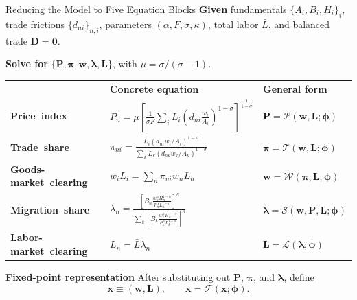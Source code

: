 \documentclass[aspectratio=169,11pt]{beamer}
\newcommand{\B}[1]{\textcolor{blue1}{\textbf{#1}}}
\begin{document}
\begin{frame}[t]{Reducing the Model to Five Equation Blocks}
  \scriptsize
  \B{Given}\quad
  fundamentals \(\{A_i,B_i,H_i\}_i\), trade frictions
  \(\{d_{ni}\}_{n,i}\), parameters \((\alpha,F,\sigma,\kappa)\),
  total labor \(\bar L\), and balanced trade \(\mathbf D=\mathbf0\).

  \smallskip
  \B{Solve for}\quad
  \(\{\mathbf P,\boldsymbol\pi,\mathbf w,
  \boldsymbol\lambda,\mathbf L\}\), with
  \(\mu=\sigma/(\sigma-1)\).

  \vspace{0.3em}
  {
  \renewcommand{\arraystretch}{0.98}
  \begin{tabular}{
    @{}>{\raggedright\arraybackslash}m{}
    >{\centering\arraybackslash}m{}
    >{\centering\arraybackslash}m{}@{}}
    & \B{Concrete equation} & \B{General form} \tabularnewline[0.45em]

    \mbox{\B{Price index}}
      & \(\displaystyle
        P_n=\mu\left[
          \frac{1}{\sigma F}\sum_iL_i
          \left(d_{ni}\frac{w_i}{A_i}\right)^{1-\sigma}
        \right]^{\frac{1}{1-\sigma}}
        \)
      & \(\displaystyle \mathbf P=\mathcal P(\mathbf w,\mathbf L;\boldsymbol\phi)\)
      \tabularnewline[0.60em]

    \mbox{\B{Trade share}}
      & \(\displaystyle
        \pi_{ni}=\frac{L_i(d_{ni}w_i/A_i)^{1-\sigma}}
        {\sum_kL_k(d_{nk}w_k/A_k)^{1-\sigma}}
        \)
      & \(\displaystyle \boldsymbol\pi=\mathcal T(\mathbf w,\mathbf L;\boldsymbol\phi)\)
      \tabularnewline[0.60em]

    \mbox{\B{Goods-market clearing}}
      & \(\displaystyle
        w_iL_i=\sum_n\pi_{ni}w_nL_n
        \)
      & \(\displaystyle \mathbf w=\mathcal W(\boldsymbol\pi,\mathbf L;\boldsymbol\phi)\)
      \tabularnewline[0.60em]

    \mbox{\B{Migration share}}
      & \(\displaystyle
        \lambda_n=\frac{
          \left[
          B_n\frac{w_n^\alpha H_n^{1-\alpha}}
          {P_n^\alpha L_n^{1-\alpha}}
          \right]^\kappa
        }{
          \displaystyle\sum_k\left[
          B_k\frac{w_k^\alpha H_k^{1-\alpha}}
          {P_k^\alpha L_k^{1-\alpha}}
          \right]^\kappa
        }
        \)
      & \(\displaystyle \boldsymbol\lambda=\mathcal S
        (\mathbf w,\mathbf P,\mathbf L;\boldsymbol\phi)\)
      \tabularnewline[0.60em]

    \mbox{\B{Labor-market clearing}}
      & \(\displaystyle L_n=\bar L\lambda_n\)
      & \(\displaystyle \mathbf L=\mathcal L
        (\boldsymbol\lambda;\boldsymbol\phi)\)
      \tabularnewline
  \end{tabular}
  }

  \vspace{-0.1em}
  \B{Fixed-point representation}\quad
  After substituting out \(\mathbf P\), \(\boldsymbol\pi\), and
  \(\boldsymbol\lambda\), define
  \[
    \mathbf x\equiv(\mathbf w,\mathbf L),
    \qquad
    \mathbf x=\mathcal F(\mathbf x;\boldsymbol\phi).
  \]
\end{frame}
\end{document}
